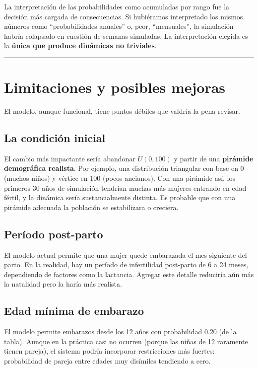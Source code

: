 \documentclass[12pt,a4paper]{article}
\begin{document}
La interpretación de las probabilidades como acumuladas por rango fue la decisión más cargada de consecuencias. Si hubiéramos interpretado los mismos números como ``probabilidades anuales'' o, peor, ``mensuales'', la simulación habría colapsado en cuestión de semanas simuladas. La interpretación elegida es la \textbf{única que produce dinámicas no triviales}.

\begin{center}\rule{0.7\linewidth}{0.4pt}\end{center}

\section{Limitaciones y posibles mejoras}

El modelo, aunque funcional, tiene puntos débiles que valdría la pena revisar.

\subsection{La condición inicial}

El cambio más impactante sería abandonar $U(0, 100)$ y partir de una \textbf{pirámide demográfica realista}. Por ejemplo, una distribución triangular con base en 0 (muchos niños) y vértice en 100 (pocos ancianos). Con una pirámide así, los primeros 30 años de simulación tendrían muchas más mujeres entrando en edad fértil, y la dinámica sería sustancialmente distinta. Es probable que con una pirámide adecuada la población se estabilizara o creciera.

\subsection{Período post-parto}

El modelo actual permite que una mujer quede embarazada el mes siguiente del parto. En la realidad, hay un período de infertilidad post-parto de 6 a 24 meses, dependiendo de factores como la lactancia. Agregar este detalle reduciría aún más la natalidad pero la haría más realista.

\subsection{Edad mínima de embarazo}

El modelo permite embarazos desde los 12 años con probabilidad 0.20 (de la tabla). Aunque en la práctica casi no ocurren (porque las niñas de 12 raramente tienen pareja), el sistema podría incorporar restricciones más fuertes: probabilidad de pareja entre edades muy disímiles tendiendo a cero.
\end{document}
